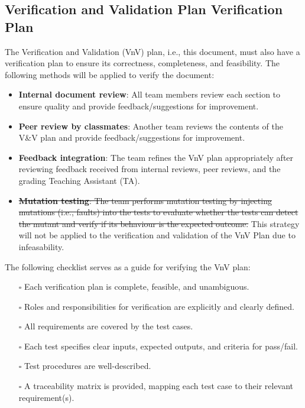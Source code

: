 \documentclass[12pt, titlepage]{article}
\begin{document}
\subsection{Verification and Validation Plan Verification Plan}
The Verification and Validation (VnV) plan, i.e., this document, must also have
a verification plan to ensure its correctness, completeness, and feasibility.
The following methods will be applied to verify the document:
\begin{itemize}
  \item \textbf{Internal document review}: All team members review each section
  to ensure quality and provide feedback/suggestions for improvement.
  \item \textbf{Peer review by classmates}: Another team reviews the contents of
  the V\&V plan and provide feedback/suggestions for improvement.
  \item \textbf{Feedback integration}: The team refines the VnV plan
  appropriately after reviewing feedback received from internal reviews, peer
  reviews, and the grading Teaching Assistant (TA).
  \item \st{\textbf{Mutation testing}: The team performs mutation testing by
  injecting mutations (i.e., faults) into the tests to evaluate whether the
  tests can detect the mutant and verify if its behaviour is the expected
  outcome.} This strategy will not be applied to the verification and validation
  of the VnV Plan due to infeasability.
\end{itemize}
The following checklist serves as a guide for verifying the VnV plan:
\begin{itemize}
  \item[$\square$] Each verification plan is complete, feasible, and
  unambiguous.
  \item[$\square$] Roles and responsibilities for verification are explicitly
  and clearly defined.
  \item[$\square$] All requirements are covered by the test cases.
  \item[$\square$] Each test specifies clear inputs, expected outputs, and
  criteria for pass/fail.
  \item[$\square$] Test procedures are well-described.
  \item[$\square$] A traceability matrix is provided, mapping each test case to
  their relevant requirement(s).
\end{itemize}
\end{document}
